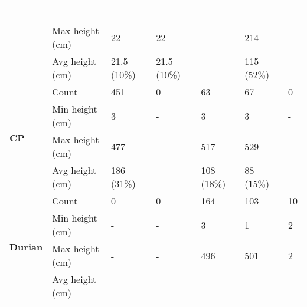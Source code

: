 \begin{longtable}{|p{2cm}|p{2cm}|p{1.5cm}|p{1.5cm}|p{1.5cm}|p{1.5cm}|p{1.5cm}|}
						\multicolumn{1}{l|}{-} \\\cline{2-7} &
						\multicolumn{1}{l|}{Max height (cm)} & 
						\multicolumn{1}{l|}{22} & 
						\multicolumn{1}{l|}{22} &
						\multicolumn{1}{l|}{-} & 
						\multicolumn{1}{l|}{214} &
						\multicolumn{1}{l|}{-} \\\cline{2-7} &
						\multicolumn{1}{l|}{Avg height (cm)} & 
						\multicolumn{1}{l|}{21.5 (10\%)} & 
						\multicolumn{1}{l|}{21.5 (10\%)} &
						\multicolumn{1}{l|}{-} & 
						\multicolumn{1}{l|}{115 (52\%)} & 
						\multicolumn{1}{l|}{-} \\\cline{2-7}
		\hline    
		\multirow{4}{*}{\textbf{CP}} & 
						\multicolumn{1}{l|}{Count} & 
						\multicolumn{1}{l|}{451} & 
						\multicolumn{1}{l|}{0} &
						\multicolumn{1}{l|}{63} & 
						\multicolumn{1}{l|}{67} &
						\multicolumn{1}{l|}{0} \\\cline{2-7} &
						\multicolumn{1}{l|}{Min height (cm)} & 
						\multicolumn{1}{l|}{3} & 
						\multicolumn{1}{l|}{-} &
						\multicolumn{1}{l|}{3} & 
						\multicolumn{1}{l|}{3} &
						\multicolumn{1}{l|}{-} \\\cline{2-7} &
						\multicolumn{1}{l|}{Max height (cm)} & 
						\multicolumn{1}{l|}{477} & 
						\multicolumn{1}{l|}{-} &
						\multicolumn{1}{l|}{517} & 
						\multicolumn{1}{l|}{529} &
						\multicolumn{1}{l|}{-} \\\cline{2-7} &
						\multicolumn{1}{l|}{Avg height (cm)} & 
						\multicolumn{1}{l|}{186 (31\%)} & 
						\multicolumn{1}{l|}{-} &
						\multicolumn{1}{l|}{108 (18\%)} & 
						\multicolumn{1}{l|}{88 (15\%)} & 
						\multicolumn{1}{l|}{-} \\\cline{2-7}
		\hline    
		\multirow{4}{*}{\textbf{Durian}} & 
						\multicolumn{1}{l|}{Count} & 
						\multicolumn{1}{l|}{0} & 
						\multicolumn{1}{l|}{0} &
						\multicolumn{1}{l|}{164} & 
						\multicolumn{1}{l|}{103} &
						\multicolumn{1}{l|}{10} \\\cline{2-7} &
						\multicolumn{1}{l|}{Min height (cm)} & 
						\multicolumn{1}{l|}{-} & 
						\multicolumn{1}{l|}{-} &
						\multicolumn{1}{l|}{3} & 
						\multicolumn{1}{l|}{1} &
						\multicolumn{1}{l|}{2} \\\cline{2-7} &
						\multicolumn{1}{l|}{Max height (cm)} & 
						\multicolumn{1}{l|}{-} & 
						\multicolumn{1}{l|}{-} &
						\multicolumn{1}{l|}{496} & 
						\multicolumn{1}{l|}{501} &
						\multicolumn{1}{l|}{2} \\\cline{2-7} &
						\multicolumn{1}{l|}{Avg height (cm)} & 

\end{longtable}
